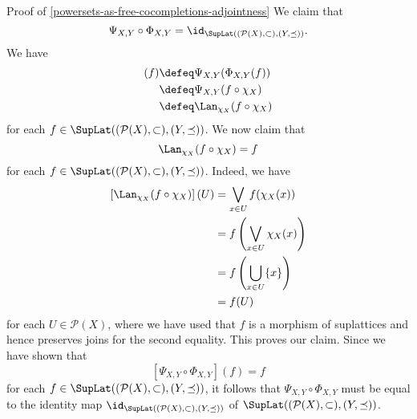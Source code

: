 \begin{Proof}{Proof of \cref{powersets-as-free-cocompletions-adjointness}}
    We claim that
    \[
        \Psi_{X,Y}\circ\Phi_{X,Y}%
        =%
        \id_{\SupLat((\mathcal{P}(X),\subset),(Y,\preceq))}.%
    \]%
    We have
    \begin{align*}
        [\Psi_{X,Y}\circ\Phi_{X,Y}](f) &\defeq \Psi_{X,Y}(\Phi_{X,Y}(f))\\%
                                       &\defeq \Psi_{X,Y}(f\circ\chi_{X})\\%
                                       &\defeq \Lan_{\chi_{X}}(f\circ\chi_{X})\\%
    \end{align*}
    for each $f\in\SupLat((\mathcal{P}(X),\subset),(Y,\preceq))$. We now claim that
    \[
        \Lan_{\chi_{X}}(f\circ\chi_{X})%
        =%
        f%
    \]%
    for each $f\in\SupLat((\mathcal{P}(X),\subset),(Y,\preceq))$. Indeed, we have
    \begin{align*}
        \left[\Lan_{\chi_{X}}(f\circ\chi_{X})\right](U) &= \bigvee_{x\in U} f(\chi_{X}(x))\\%
                                                        &= f\left(\bigvee_{x\in U}\chi_{X}(x)\right)\\%
                                                        &= f\left(\bigcup_{x\in U}\{x\}\right)\\%
                                                        &= f(U)%
    \end{align*}
    for each $U\in\mathcal{P}(X)$, where we have used that $f$ is a morphism of suplattices and hence preserves joins for the second equality. This proves our claim. Since we have shown that
    \[
        [\Psi_{X,Y}\circ\Phi_{X,Y}](f)%
        =%
        f%
    \]%
    for each $f\in\SupLat((\mathcal{P}(X),\subset),(Y,\preceq))$, it follows that $\Psi_{X,Y}\circ\Phi_{X,Y}$ must be equal to the identity map $\id_{\SupLat((\mathcal{P}(X),\subset),(Y,\preceq))}$ of $\SupLat((\mathcal{P}(X),\subset),(Y,\preceq))$.


\end{Proof}
